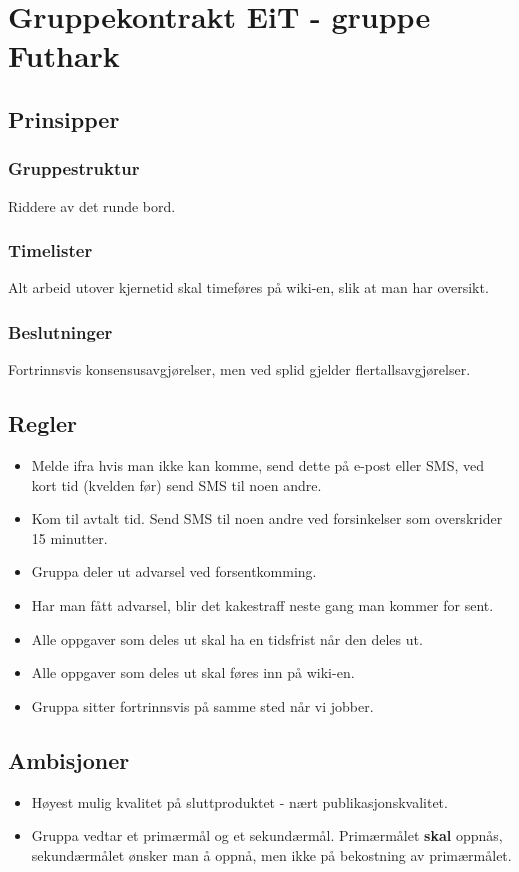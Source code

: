 \documentclass[a4paper, norsk, 12pt]{report}
\begin{document}
\chapter*{Gruppekontrakt EiT - gruppe Futhark}
\section*{Prinsipper}
\subsection*{Gruppestruktur}
Riddere av det runde bord.

\subsection*{Timelister}
Alt arbeid utover kjernetid skal timeføres på wiki-en, slik at man har oversikt.

\subsection*{Beslutninger}
Fortrinnsvis konsensusavgjørelser, men ved splid gjelder flertallsavgjørelser.

\section*{Regler}
\begin{itemize}
 \item Melde ifra hvis man ikke kan komme, send dette på e-post eller SMS, ved kort tid (kvelden før) send SMS til noen andre.
 \item Kom til avtalt tid. Send SMS til noen andre ved forsinkelser som overskrider 15 minutter.
 \item Gruppa deler ut advarsel ved forsentkomming.
 \item Har man fått advarsel, blir det kakestraff neste gang man kommer for sent.
 \item Alle oppgaver som deles ut skal ha en tidsfrist når den deles ut.
 \item Alle oppgaver som deles ut skal føres inn på wiki-en.
 \item Gruppa sitter fortrinnsvis på samme sted når vi jobber.
\end{itemize}

\section*{Ambisjoner}
\begin{itemize}
  \item Høyest mulig kvalitet på sluttproduktet - nært publikasjonskvalitet.
  \item Gruppa vedtar et primærmål og et sekundærmål. Primærmålet \textbf{skal}
    oppnås, sekundærmålet ønsker man å oppnå, men ikke på bekostning av
    primærmålet.
\end{itemize}
\end{document}
